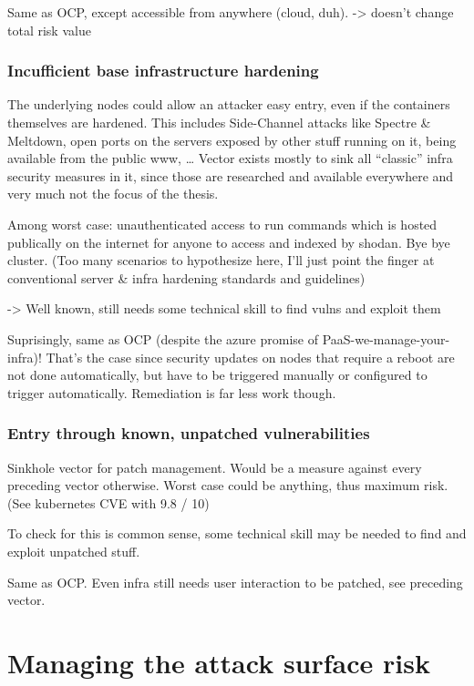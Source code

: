 Same as OCP, except accessible from anywhere (cloud, duh).
-> doesn’t change total risk value

\subsection{Incufficient base infrastructure hardening}
The underlying nodes could allow an attacker easy entry, even if the containers themselves are hardened. This includes Side-Channel attacks like Spectre \& Meltdown, open ports on the servers exposed by other stuff running on it, being available from the public www, …
Vector exists mostly to sink all “classic” infra security measures in it, since those are researched and available everywhere and very much not the focus of the thesis.

Among worst case: unauthenticated access to run commands which is hosted publically on the internet for anyone to access and indexed by shodan. Bye bye cluster.
(Too many scenarios to hypothesize here, I’ll just point the finger at conventional server \& infra hardening standards and guidelines)

-> Well known, still needs some technical skill to find vulns and exploit them

Suprisingly, same as OCP (despite the azure promise of PaaS-we-manage-your-infra)!
That’s the case since security updates on nodes that require a reboot are not done automatically, but have to be triggered manually or configured to trigger automatically.
Remediation is far less work though.

\subsection{Entry through known, unpatched vulnerabilities}
Sinkhole vector for patch management. Would be a measure against every preceding vector otherwise.
Worst case could be anything, thus maximum risk. (See kubernetes CVE with 9.8 / 10)

To check for this is common sense, some technical skill may be needed to find and exploit unpatched stuff.

Same as OCP. Even infra still needs user interaction to be patched, see preceding vector.

\chapter{Managing the attack surface risk}

